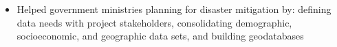 \documentclass[letterpaper]{article}
\newcommand{\employer}[4]{
        \textbf{#1}  %
        \hfill #2\\  %
        \textit{#3}  %
        \hfill #4\\  %
        \vspace{1mm}
    }
\begin{document}
\vspace{-9pt}
\begin{itemize} \itemsep 0pt
    \item Helped government ministries planning for disaster mitigation by:
    defining data needs with project stakeholders, consolidating demographic,
    socioeconomic, and geographic data sets, and building 
    geodatabases
    
\end{itemize}


%
%
%
%
%
%
\end{document}
